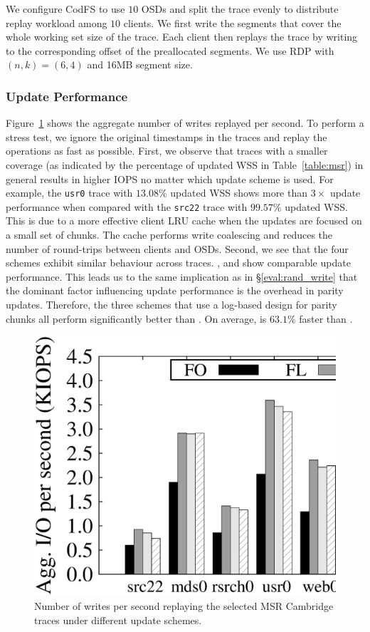 We configure CodFS to use $10$ OSDs and split the trace evenly to
distribute replay workload among $10$ clients. We first write the segments
that cover the whole working set size of the trace.  Each client then replays
the trace by writing to the corresponding offset of the preallocated segments.
We use RDP \cite{corbett04} with $(n,k)=(6,4)$ and 16MB segment size. 

\subsubsection{Update Performance} Figure~\ref{fig:msr_update} shows the aggregate
number of writes replayed per second. To perform a stress test, we ignore the
original timestamps in the traces and replay the operations as fast as possible.
First, we observe that
traces with a smaller coverage (as indicated by the percentage of updated WSS in
Table~\ref{table:msr}) in general results in higher IOPS no matter which update
scheme is used. For example, the \texttt{usr0} trace with $13.08\%$ updated
WSS shows more than ${3\times}$ update performance when compared with the
\texttt{src22} trace with $99.57\%$ updated WSS.  This
is due to a more effective client LRU cache when the updates are focused on a
small set of chunks. The cache performs write coalescing and reduces the number
of round-trips between clients and OSDs. Second, we see that the four schemes
exhibit similar behaviour across traces. \FL, \PL and \PLR show comparable
update performance.  This leads us to the same implication as in
\S\ref{eval:rand_write} that the dominant factor influencing update performance
is the overhead in parity updates. Therefore, the three schemes that use a
log-based design for parity chunks all perform significantly better than \FO. On
average, \PLR is ${63.1}\%$ faster than \FO.

\begin{figure}[t]
    \centering
    \includegraphics[width=0.8\linewidth]{charts/msr_update/eps/msr_update}
    \caption{Number of writes per second replaying the selected MSR
        Cambridge traces under different update schemes.}
    \label{fig:msr_update}
\end{figure}


